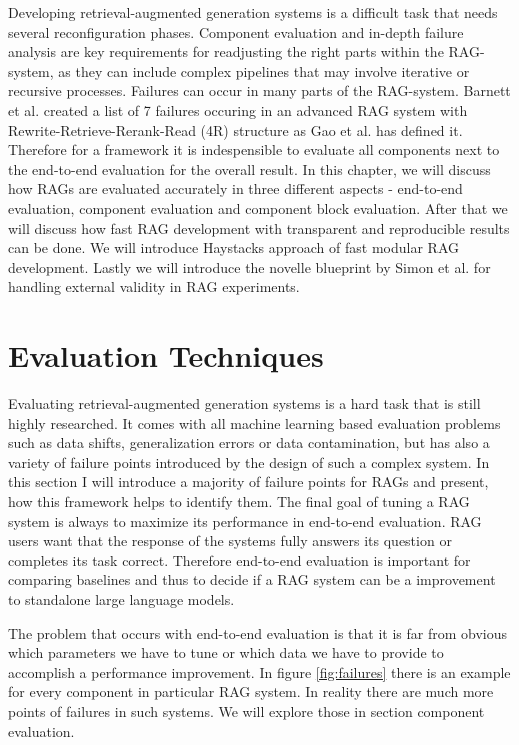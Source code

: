 

Developing retrieval-augmented generation systems is a difficult task that needs several reconfiguration phases.\cite{Simon.10112024} Component evaluation and in-depth failure analysis are key requirements for readjusting the right parts within the RAG-system, as they can include complex pipelines that may involve iterative or recursive processes. Failures can occur in many parts of the RAG-system. Barnett et al.\cite{Barnett.2024} created a list of 7 failures occuring in an advanced RAG system with Rewrite-Retrieve-Rerank-Read (4R) structure as Gao et al.\cite{Gao.18.12.2023} has defined it. Therefore for a framework it is indespensible to evaluate all components next to the end-to-end evaluation for the overall result. In this chapter, we will discuss how RAGs are evaluated accurately in three different aspects - end-to-end evaluation, component evaluation and component block evaluation. After that we will discuss how fast RAG development with transparent and reproducible results can be done. We will introduce Haystacks approach of fast modular RAG development. Lastly we will introduce the novelle blueprint by Simon et al.\cite{Simon.10112024} for handling external validity in RAG experiments. 

\section{Evaluation Techniques}

Evaluating retrieval-augmented generation systems is a hard task that is still highly researched. It comes with all machine learning based evaluation problems such as data shifts, generalization errors or data contamination, but has also a variety of failure points introduced by the design of such a complex system. In this section I will introduce a majority of failure points for RAGs and present, how this framework helps to identify them. The final goal of tuning a RAG system is always to maximize its performance in end-to-end evaluation. RAG users want that the response of the systems fully answers its question or completes its task correct. Therefore end-to-end evaluation is important for comparing baselines and thus to decide if a RAG system can be a improvement to standalone large language models. 


The problem that occurs with end-to-end evaluation is that it is far from obvious which parameters we have to tune or which data we have to provide to accomplish a performance improvement. In figure \ref{fig:failures} there is an example for every component in particular RAG system. In reality there are much more points of failures in such systems. We will explore those in section component evaluation.

